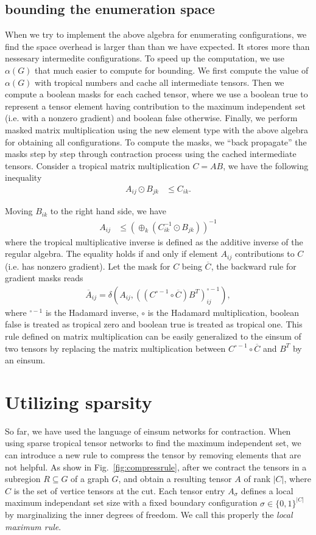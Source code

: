 \documentclass{article}
\newcommand{\<}{\langle}
\renewcommand{\>}{\rangle}
\newcommand{\Fig}[1]{Fig.~\ref{#1}}
\theoremstyle{definition}\newtheorem{definition}{\textit{Definition}}
\begin{document}
\subsection{bounding the enumeration space}
When we try to implement the above algebra for enumerating configurations, we find the space overhead is larger than than we have expected.
It stores more than nessesary intermedite configurations. To speed up the computation, we use $\alpha(G)$ that much easier to compute for bounding.
We first compute the value of $\alpha(G)$ with tropical numbers and cache all intermediate tensors.
Then we compute a boolean masks for each cached tensor, where we use a boolean true to represent a tensor element having contribution to the maximum independent set (i.e. with a nonzero gradient) and boolean false otherwise.
Finally, we perform masked matrix multiplication using the new element type with the above algebra for obtaining all configurations.
To compute the masks, we ``back propagate'' the masks step by step through contraction process using the cached intermediate tensors.
Consider a tropical matrix multiplication $C = A B$, we have the following inequality
\begin{align}
    A_{ij} \odot B_{jk} &\leq C_{ik}.
\end{align}

Moving $B_{ik}$ to the right hand side, we have
\begin{align}
    A_{ij} &\leq (\oplus_{k} (C_{ik}^{-1} \odot B_{jk}))^{-1}
\end{align}
where the tropical multiplicative inverse is defined as the additive inverse of the regular algebra. The equality holds if and only if element $A_{ij}$ contributions to $C$ (i.e. has nonzero gradient).
Let the mask for $C$ being $\overline C$, the backward rule for gradient masks reads
\begin{align}
\overline{A}_{ij} = \delta(A_{ij}, ((C^{\circ-1} \circ \overline C )B^T)_{ij}^{\circ -1}),
\end{align}
where ${}^{\circ -1}$ is the Hadamard inverse, $\circ$ is the Hadamard multiplication, boolean false is treated as tropical zero and boolean true is treated as tropical one.
This rule defined on matrix multiplication can be easily generalized to the einsum of two tensors by replacing the matrix multiplication between $C^{\circ-1} \circ \overline C$ and $B^T$ by an einsum.

\section{Utilizing sparsity}
So far, we have used the language of einsum networks for contraction.
When using sparse tropical tensor networks to find the maximum independent set, we can introduce a new rule to compress the tensor by removing elements that are not helpful.
As show in \Fig{fig:compressrule}, after we contract the tensors in a subregion $R \subseteq G$ of a graph $G$, and obtain a resulting tensor $A$ of rank $|C|$, where $C$ is the set of vertice tensors at the cut.
Each tensor entry $A_{\sigma}$ defines a local maximum independant set size with a fixed boundary configuration $\sigma \in \{0,1\}^{|C|}$ by marginalizing the inner degrees of freedom.
We call this properly the \textit{local maximum rule}.
\end{document}
